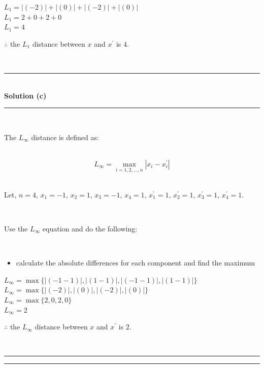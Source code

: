 \documentclass{article}
\begin{document}
$L_1 = |(-2)| + |(0)| + |(-2)| + |(0)|$\\

$L_1 = 2 + 0 + 2 + 0$\\

$L_1 = 4$\\

\parbox{\textwidth}{$\therefore$ the $L_1$ distance between $x$ and $x^{\prime}$ is $4$.}\\

\noindent\rule{\textwidth}{0.4pt}\\

\textbf{Solution (c)}

\noindent\rule{\textwidth}{0.4pt}\\

\parbox{\textwidth}{The $L_{\infty}$ distance is defined as:}\\

$$L_{\infty} = \max_{i=1,2,...,n} |x_i - x^{\prime}_i|$$\\

\parbox{\textwidth}{Let, $n = 4$, $x_1 = -1$, $x_2 = 1$, $x_3 = -1$, $x_4 = 1$, $x^{\prime}_1 = 1$, $x^{\prime}_2 = 1$, $x^{\prime}_3 = 1$, $x^{\prime}_4 = 1$.}\\

\parbox{\textwidth}{Use the $L_{\infty}$ equation and do the following:}\\

\begin{itemize}
    \item {calculate the absolute differences for each component and find the maximum}\\
\end{itemize}

$L_{\infty} = \max\{|(-1 - 1)|, |(1 - 1)|, |(-1 - 1)|, |(1 - 1)|\}$\\

$L_{\infty} = \max\{|(-2)|, |(0)|, |(-2)|, |(0)|\}$\\

$L_{\infty} = \max\{2, 0, 2, 0\}$\\

$L_{\infty} = 2$\\

\parbox{\textwidth}{$\therefore$ the $L_{\infty}$ distance between $x$ and $x^{\prime}$ is $2$.}\\


\noindent\rule{\textwidth}{0.4pt}
\noindent\rule{\textwidth}{0.4pt}\\
\end{document}
